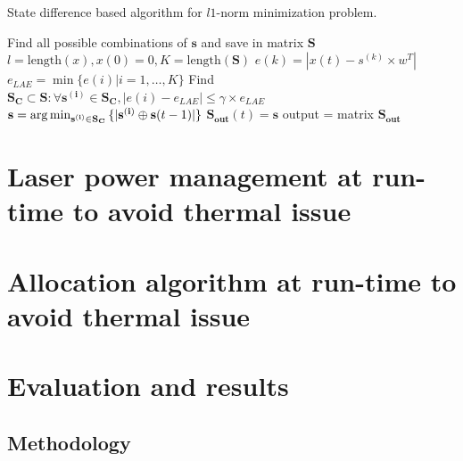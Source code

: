 \begin{algorithm}
\caption{State difference based algorithm for $l1$-norm minimization problem.}\label{algoL2}
\begin{algorithmic}[1]
\State Find all possible combinations of $\mathbf{s}$ and save in matrix $\mathbf{S}$
\State $l = \text{length}(x),x(0) = 0,K=\text{length}(\mathbf{S})$
	        \State $e(k) = |x(t)-s^{(k)}\times w^T|$
	    \EndFor
		\State $e_{LAE} = \min{\{e(i)|i=1,\ldots,K\}}$
		\State Find $\mathbf{S_C}\subset \mathbf{S}: \forall \mathbf{s^{(i)}}\in \mathbf{S_C},|e(i)-e_{LAE}|\leq \gamma \times e_{LAE}$
		\State $\mathbf{s} = \operatorname*{arg\,min}_{\mathbf{s^{(i)}}\in \mathbf{S_C}}{\{|\mathbf{s^{(i)}}\oplus \mathbf{s}(t-1)|\}}$
		\State $\mathbf{S_{out}}(t) = \mathbf{s}$ 
	\EndFor
\State output = matrix $\mathbf{S_{out}}$
\EndFunction
\end{algorithmic}
\end{algorithm}






\section{Laser power management at run-time to avoid thermal issue}\label{proba}
\section{Allocation algorithm at run-time to avoid thermal issue}\label{proba}
\section{Evaluation and results}
\subsection{Methodology}
